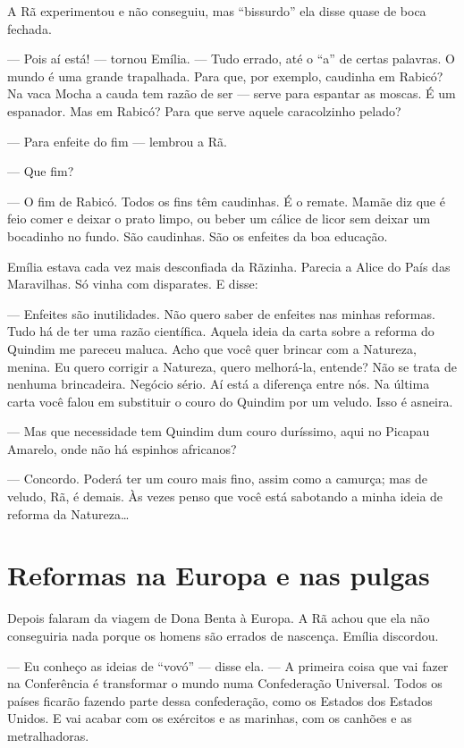 A Rã experimentou e não conseguiu, mas ``bissurdo'' ela disse quase de
boca fechada.

--- Pois aí está! --- tornou Emília. --- Tudo errado, até o ``a'' de
certas palavras. O mundo é uma grande trapalhada. Para que, por exemplo,
caudinha em Rabicó? Na vaca Mocha a cauda tem razão de ser --- serve
para espantar as moscas. É um espanador. Mas em Rabicó? Para que serve
aquele caracolzinho pelado?

--- Para enfeite do fim --- lembrou a Rã.

--- Que fim?

--- O fim de Rabicó. Todos os fins têm caudinhas. É o remate. Mamãe diz
que é feio comer e deixar o prato limpo, ou beber um cálice de licor sem
deixar um bocadinho no fundo. São caudinhas. São os enfeites da boa
educação.

Emília estava cada vez mais desconfiada da Rãzinha. Parecia a Alice do
País das Maravilhas. Só vinha com disparates. E disse:

--- Enfeites são inutilidades. Não quero saber de enfeites nas minhas
reformas. Tudo há de ter uma razão científica. Aquela ideia da carta
sobre a reforma do Quindim me pareceu maluca. Acho que você quer brincar
com a Natureza, menina. Eu quero corrigir a Natureza, quero melhorá-la,
entende? Não se trata de nenhuma brincadeira. Negócio sério. Aí está a
diferença entre nós. Na última carta você falou em substituir o couro do
Quindim por um veludo. Isso é asneira.

--- Mas que necessidade tem Quindim dum couro duríssimo, aqui no Picapau
Amarelo, onde não há espinhos africanos?

--- Concordo. Poderá ter um couro mais fino, assim como a camurça; mas
de veludo, Rã, é demais. Às vezes penso que você está sabotando a minha
ideia de reforma da Natureza\ldots{}


\chapter{Reformas na Europa e nas pulgas}

Depois falaram da viagem de Dona Benta à Europa. A Rã achou que ela não
conseguiria nada porque os homens são errados de nascença. Emília
discordou.

--- Eu conheço as ideias de ``vovó'' --- disse ela. --- A primeira coisa
que vai fazer na Conferência é transformar o mundo numa Confederação
Universal. Todos os países ficarão fazendo parte dessa confederação,
como os Estados dos Estados Unidos. E vai acabar com os exércitos e as
marinhas, com os canhões e as metralhadoras.

